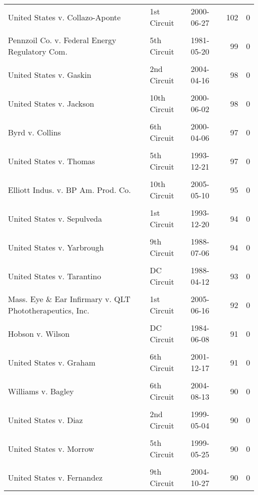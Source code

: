 \documentclass[10pt, letterpaper]{article}
\begin{document}
\begin{spacing}{1.0}
\begin{footnotesize}
\begin{longtable}[H]{p{3.5in}llrr}
United States v. Collazo-Aponte & 1st Circuit & 2000-06-27 & 102 & 0\\
& & & &\\[-6pt]
Pennzoil Co. v. Federal Energy Regulatory Com. & 5th Circuit & 1981-05-20 & 99 & 0\\
& & & &\\[-6pt]
United States v. Gaskin & 2nd Circuit & 2004-04-16 & 98 & 0\\
& & & &\\[-6pt]
United States v. Jackson & 10th Circuit & 2000-06-02 & 98 & 0\\
& & & &\\[-6pt]
Byrd v. Collins & 6th Circuit & 2000-04-06 & 97 & 0\\
& & & &\\[-6pt]
United States v. Thomas & 5th Circuit & 1993-12-21 & 97 & 0\\
& & & &\\[-6pt]
Elliott Indus. v. BP Am. Prod. Co. & 10th Circuit & 2005-05-10 & 95 & 0\\
& & & &\\[-6pt]
United States v. Sepulveda & 1st Circuit & 1993-12-20 & 94 & 0\\
& & & &\\[-6pt]
United States v. Yarbrough & 9th Circuit & 1988-07-06 & 94 & 0\\
& & & &\\[-6pt]
United States v. Tarantino & DC Circuit & 1988-04-12 & 93 & 0\\
& & & &\\[-6pt]
Mass. Eye \& Ear Infirmary v. QLT Phototherapeutics, Inc. & 1st Circuit & 2005-06-16 & 92 & 0\\
& & & &\\[-6pt]
Hobson v. Wilson & DC Circuit & 1984-06-08 & 91 & 0\\
& & & &\\[-6pt]
United States v. Graham & 6th Circuit & 2001-12-17 & 91 & 0\\
& & & &\\[-6pt]
Williams v. Bagley & 6th Circuit & 2004-08-13 & 90 & 0\\
& & & &\\[-6pt]
United States v. Diaz & 2nd Circuit & 1999-05-04 & 90 & 0\\
& & & &\\[-6pt]
United States v. Morrow & 5th Circuit & 1999-05-25 & 90 & 0\\
& & & &\\[-6pt]
United States v. Fernandez & 9th Circuit & 2004-10-27 & 90 & 0\\

\end{longtable}
\end{footnotesize}
\end{spacing}
\end{document}
